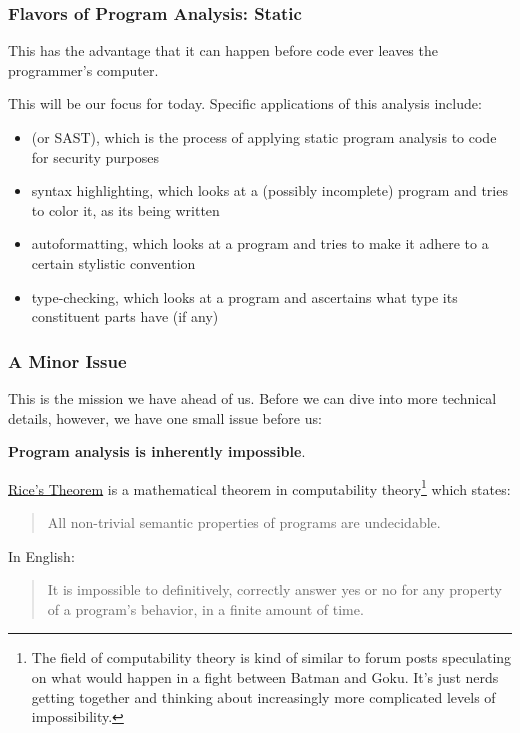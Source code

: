 \documentclass[aspectratio=169, handout]{beamer}
\begin{document}
\begin{frame}[fragile]
  \frametitle{Flavors of Program Analysis: Static}


  \pause
  \vspace{\fill}

  This has the advantage that it can happen before code ever leaves the programmer's
  computer.

  \pause
  \vspace{\fill}

  This will be our focus for today. Specific applications of this analysis include:
  \pause
  \begin{itemize}
    \item {} (or SAST), which is
    the process of applying static program analysis to code for security purposes \pause
    \item syntax highlighting, which looks at a (possibly incomplete) program
    and tries to color it, as its being written \pause
    \item autoformatting, which looks at a program and tries to make it adhere to
    a certain stylistic convention \pause
    \item type-checking, which looks at a program and ascertains what type its
    constituent parts have (if any)
  \end{itemize}
\end{frame}

\begin{frame}[fragile]
  \frametitle{A Minor Issue}

  This is the mission we have ahead of us. Before we can dive into more
  technical details, however, we have one small issue before us:

  \pause
  \vspace{\fill}

  \textbf{Program analysis is inherently impossible}.

  \pause
  \vspace{\fill}

  {\color{blue}\href{https://en.wikipedia.org/wiki/Rice%27s_theorem}{Rice's
  Theorem}} is a mathematical theorem in computability theory\footnote{The field
  of computability theory is kind of similar to forum posts speculating on what
  would happen in a fight between Batman and Goku. It's just nerds getting
  together and thinking about increasingly more complicated levels of
  impossibility.} which states:
  \begin{quote}
    All non-trivial semantic properties of programs are undecidable.
  \end{quote}

  \pause
  \vspace{\fill}

  In English:
  \begin{quote}
   It is impossible to definitively, correctly answer yes or no for any property of a
   program's behavior, in a finite amount of time.
  \end{quote}
\end{frame}
\end{document}
